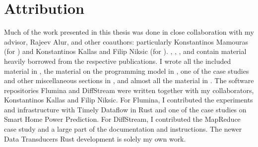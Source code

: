 \section{Attribution}

Much of the work presented in this thesis was done in close collaboration with my advisor, Rajeev Alur, and other coauthors:
particularly Konstantinos Mamouras (for ) and Konstantinos Kallas and Filip Niksic (for ).
, , , and  contain material heavily borrowed from the respective publications.
I wrote all the included material in , the material on the programming model in , one of the case studies and other miscellaneous sections in , and almost all the material in .
The software repositories Flumina and DiffStream were written together with my collaborators, Konstantinos Kallas and Filip Niksic.
For Flumina, I contributed the experiments and infrastructure with Timely Dataflow in Rust and one of the case studies on Smart Home Power Prediction.
For DiffStream, I contributed the MapReduce case study and a large part of the documentation and instructions.
The newer Data Transducers Rust development is solely my own work.

